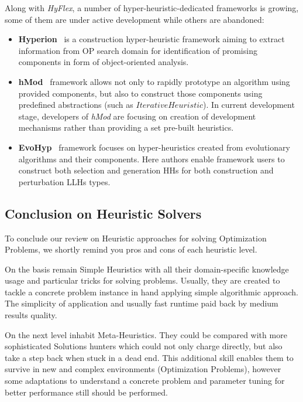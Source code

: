Along with \textit{HyFlex}, a number of hyper-heuristic-dedicated frameworks is growing, some of them are under active development while others are abandoned:
\begin{itemize}[itemsep=8pt]
	\item \textbf{Hyperion}~\cite{swan2011hyperion} is a construction hyper-heuristic framework aiming to extract information from OP search domain for identification of promising components in form of object-oriented analysis.
	
	\item \textbf{hMod}~\cite{urra2013hMod} framework allows not only to rapidly prototype an algorithm using provided components, but also to construct those components using predefined abstractions (such as $IterativeHeuristic$). In current development stage, developers of \textit{hMod} are focusing on creation of development mechanisms rather than providing a set pre-built heuristics. 
	
	\item \textbf{EvoHyp}~\cite{pillay2017evohyp} framework focuses on hyper-heuristics created from evolutionary algorithms and their components. Here authors enable framework users to construct both selection and generation HHs for both construction and perturbation LLHs types.
\end{itemize}


\subsection{Conclusion on Heuristic Solvers}
To conclude our review on Heuristic approaches for solving Optimization Problems, we shortly remind you pros and cons of each heuristic level.

On the basis remain Simple Heuristics with all their domain-specific knowledge usage and particular tricks for solving problems. Usually, they are created to tackle a concrete problem instance in hand applying simple algorithmic approach. The simplicity of application and usually fast runtime paid back by medium results quality.

On the next level inhabit Meta-Heuristics. They could be compared with more sophisticated Solutions hunters which could not only charge directly, but also take a step back when stuck in a dead end. This additional skill enables them to survive in new and complex environments (Optimization Problems), however some adaptations to understand a concrete problem and parameter tuning for better performance still should be performed.

